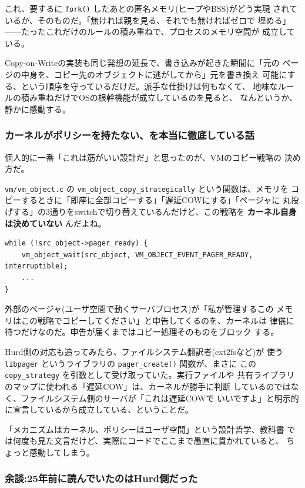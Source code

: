 \documentclass[11pt]{article}
\begin{document}
これ、要するに \texttt{fork()} したあとの匿名メモリ(ヒープやBSS)がどう実現
されているか、そのものだ。「無ければ親を見る、それでも無ければゼロで
埋める」——たったこれだけのルールの積み重ねで、プロセスのメモリ空間が
成立している。

Copy-on-Writeの実装も同じ発想の延長で、書き込みが起きた瞬間に「元の
ページの中身を、コピー先のオブジェクトに逃がしてから」元を書き換え
可能にする、という順序を守っているだけだ。派手な仕掛けは何もなくて、
地味なルールの積み重ねだけでOSの根幹機能が成立しているのを見ると、
なんというか、静かに感動する。
\subsubsection{カーネルがポリシーを持たない、を本当に徹底している話}
\label{sec:org06dd3ef}

個人的に一番「これは筋がいい設計だ」と思ったのが、VMのコピー戦略の
決め方だ。

\texttt{vm/vm\_object.c} の \texttt{vm\_object\_copy\_strategically} という関数は、メモリを
コピーするときに「即座に全部コピーする」「遅延COWにする」「ページャに
丸投げする」の3通りをswitchで切り替えているんだけど、この戦略を
\textbf{カーネル自身は決めていない} んだよね。

\begin{verbatim}
while (!src_object->pager_ready) {
    vm_object_wait(src_object, VM_OBJECT_EVENT_PAGER_READY, interruptible);
    ...
}
\end{verbatim}

外部のページャ(ユーザ空間で動くサーバプロセス)が「私が管理するこの
メモリはこの戦略でコピーしてください」と申告してくるのを、カーネルは
律儀に待つだけなのだ。申告が届くまではコピー処理そのものをブロック
する。

Hurd側の対応も追ってみたら、ファイルシステム翻訳者(ext2fsなど)が
使う \texttt{libpager} というライブラリの \texttt{pager\_create()} 関数が、まさに
この \texttt{copy\_strategy} を引数として受け取っていた。実行ファイルや
共有ライブラリのマップに使われる「遅延COW」は、カーネルが勝手に判断
しているのではなく、ファイルシステム側のサーバが「これは遅延COWで
いいですよ」と明示的に宣言しているから成立している、ということだ。

「メカニズムはカーネル、ポリシーはユーザ空間」という設計哲学、教科書
では何度も見た文言だけど、実際にコードでここまで愚直に貫かれていると、
ちょっと感動してしまう。
\subsubsection{余談:25年前に読んでいたのはHurd側だった}
\label{sec:orgcb69d0a}
\end{document}
